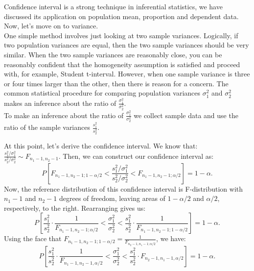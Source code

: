 Confidence interval is a strong technique in inferential statistics, we have discussed its application on population mean, proportion and dependent data. Now, let's move on to variance.\\

One simple method involves just looking at two sample variances. Logically, if two population variances are equal, then the two sample variances should be very similar. When the two sample variances are reasonably close, you can be reasonably conﬁdent that the homogeneity assumption is satisﬁed and proceed with, for example, Student t-interval. However, when one sample variance is three or four times larger than the other, then there is reason for a concern. The common statistical procedure for comparing population variances $\sigma_1^2$ and $\sigma_2^2$ makes an inference about the ratio of $\frac{\sigma_1^2}{\sigma_2^2}$.\\

To make an inference about the ratio of $\frac{\sigma_1^2}{\sigma_2^2}$ we collect sample data and use the ratio of the sample variances $\frac{s_1^2}{s_2^2}$.

At this point, let's derive the confidence interval. We know that: $\frac{s_1^2/\sigma_1^2}{s_2^2/\sigma_2^2} \sim F_{n_1-1, n_2 -1}$. Then, we can construct our confidence interval as:
	\[P[F_{n_1-1, n_2 -1; 1-\alpha/2} < \frac{s_1^2/\sigma_1^2}{s_2^2/\sigma_2^2} < F_{n_1-1, n_2 -1; \alpha/2}]  = 1 -\alpha.\]
Now, the reference distribution of this confidence interval is F-distribution with $n_1 - 1$ and $n_2 -1$ degrees of freedom, leaving areas of $1 - \alpha/2$ and $\alpha/2$, respectively, to the right. Rearranging gives us:
	\[P[\frac{s_1^2}{s_2^2} \cdot \frac{1}{F_{n_1-1, n_2 -1; \alpha/2}} < \frac{\sigma_1^2}{\sigma_2^2} < \frac{s_1^2}{s_2^2} \cdot \frac{1}{F_{n_1-1, n_2 -1; 1-\alpha/2}}] = 1 -\alpha.\]
Using the face that $F_{n_1-1,n_2-1; 1 - \alpha/2} = \frac{1}{F_{n_2-1,n_1-1; \alpha/2}}$, we have:
	\[ P[\frac{s_1^2}{s_2^2} \cdot \frac{1}{F_{n_1-1, n_2-1, \alpha/2}} < \frac{\sigma_1^2}{\sigma_2^2} < \frac{s_1^2}{s_2^2} \cdot F_{n_2-1, n_1 - 1, \alpha/2}] = 1- \alpha.\]








